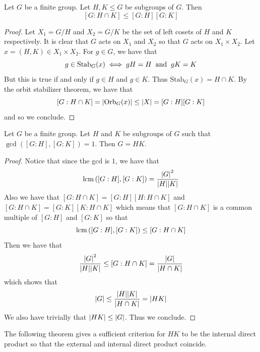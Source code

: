 \documentclass[a4paper]{article}
\begin{document}
\begin{prp}{}{} Let $G$ be a finite group. Let $H,K\leq G$ be subgroups of $G$. Then $$[G:H\cap K]\leq[G:H][G:K]$$ \tcbline
\begin{proof}
Let $X_1=G/H$ and $X_2=G/K$ be the set of left cosets of $H$ and $K$ respectively. It is clear that $G$ acts on $X_1$ and $X_2$ so that $G$ acts on $X_1\times X_2$. Let $x=(H,K)\in X_1\times X_2$. For $g\in G$, we have that $$g\in\text{Stab}_G(x)\iff gH=H\text{\;\;and\;\;}gK=K$$ But this is true if and only if $g\in H$ and $g\in K$. Thus $\text{Stab}_G(x)=H\cap K$. By the orbit stabilizer theorem, we have that $$[G:H\cap K]=\abs{\text{Orb}_G(x)}\leq\abs{X}=[G:H][G:K]$$ and so we conclude. 
\end{proof}
\end{prp}

\begin{prp}{}{} Let $G$ be a finite group. Let $H$ and $K$ be subgroups of $G$ such that $\gcd\left([G:H],[G:K]\right)=1$. Then $G=HK$. \tcbline
\begin{proof}
Notice that since the gcd is $1$, we have that $$\operatorname{lcm}\left([G:H],[G:K]\right)=\frac{\abs{G}^2}{\abs{H}\abs{K}}$$ Also we have that $[G:H\cap K]=[G:H][H:H\cap K]$ and $[G:H\cap K]=[G:K][K:H\cap K]$ which means that $[G:H\cap K]$ is a common multiple of $[G:H]$ and $[G:K]$ so that $$\operatorname{lcm}\left([G:H],[G:K]\right)\leq[G:H\cap K]$$ Then we have that $$\frac{\abs{G}^2}{\abs{H}\abs{K}}\leq[G:H\cap K]=\frac{\abs{G}}{\abs{H\cap K}}$$ which shows that $$\abs{G}\leq\frac{\abs{H}\abs{K}}{\abs{H\cap K}}=\abs{HK}$$ We also have trivially that $\abs{HK}\leq\abs{G}$. Thus we conclude. 
\end{proof}
\end{prp}

The following theorem gives a sufficient criterion for $HK$ to be the internal direct product so that the external and internal direct product coincide. 
\end{document}
